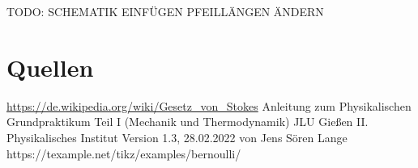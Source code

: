 \documentclass{article}
\begin{document}
    TODO: SCHEMATIK EINFÜGEN PFEILLÄNGEN ÄNDERN


    \section{Quellen}
    \url{https://de.wikipedia.org/wiki/Gesetz_von_Stokes}
    Anleitung zum Physikalischen Grundpraktikum Teil I (Mechanik und Thermodynamik) JLU Gießen II. Physikalisches Institut Version 1.3, 28.02.2022 von Jens Sören Lange
    https://texample.net/tikz/examples/bernoulli/
\end{document}
